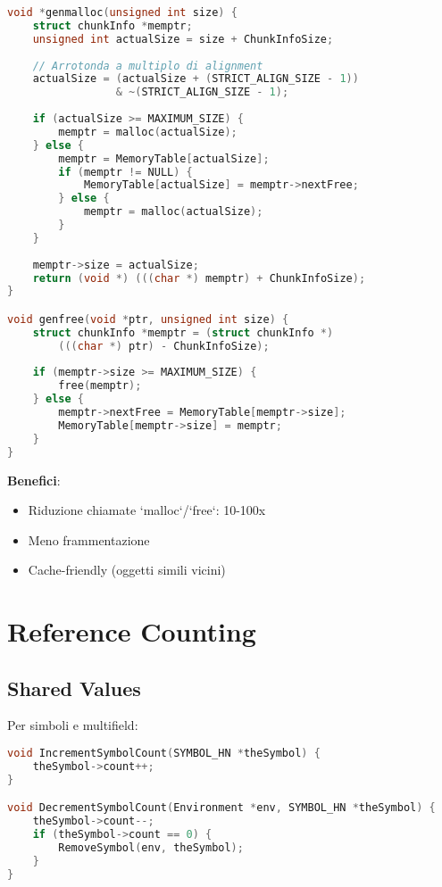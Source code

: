 \begin{lstlisting}[language=C]
void *genmalloc(unsigned int size) {
    struct chunkInfo *memptr;
    unsigned int actualSize = size + ChunkInfoSize;
    
    // Arrotonda a multiplo di alignment
    actualSize = (actualSize + (STRICT_ALIGN_SIZE - 1)) 
                 & ~(STRICT_ALIGN_SIZE - 1);
    
    if (actualSize >= MAXIMUM_SIZE) {
        memptr = malloc(actualSize);
    } else {
        memptr = MemoryTable[actualSize];
        if (memptr != NULL) {
            MemoryTable[actualSize] = memptr->nextFree;
        } else {
            memptr = malloc(actualSize);
        }
    }
    
    memptr->size = actualSize;
    return (void *) (((char *) memptr) + ChunkInfoSize);
}

void genfree(void *ptr, unsigned int size) {
    struct chunkInfo *memptr = (struct chunkInfo *)
        (((char *) ptr) - ChunkInfoSize);
    
    if (memptr->size >= MAXIMUM_SIZE) {
        free(memptr);
    } else {
        memptr->nextFree = MemoryTable[memptr->size];
        MemoryTable[memptr->size] = memptr;
    }
}
\end{lstlisting}

\textbf{Benefici}:
\begin{itemize}
\item Riduzione chiamate `malloc`/`free`: 10-100x
\item Meno frammentazione
\item Cache-friendly (oggetti simili vicini)
\end{itemize}

\section{Reference Counting}

\subsection{Shared Values}

Per simboli e multifield:

\begin{lstlisting}[language=C]
void IncrementSymbolCount(SYMBOL_HN *theSymbol) {
    theSymbol->count++;
}

void DecrementSymbolCount(Environment *env, SYMBOL_HN *theSymbol) {
    theSymbol->count--;
    if (theSymbol->count == 0) {
        RemoveSymbol(env, theSymbol);
    }
}
\end{lstlisting}

